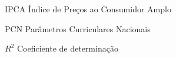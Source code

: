 \listoffigures*
\cleardoublepage


\listoftables*
\cleardoublepage

\begin{siglas}
  \item[IPCA] Índice de Preços ao Consumidor Amplo
  \item[PCN] Parâmetros Curriculares Nacionais
\end{siglas}

\begin{simbolos}
  \item[$R^2$] Coeficiente de determinação
\end{simbolos}

\tableofcontents*
\cleardoublepage

\textual
\pagestyle{simple}